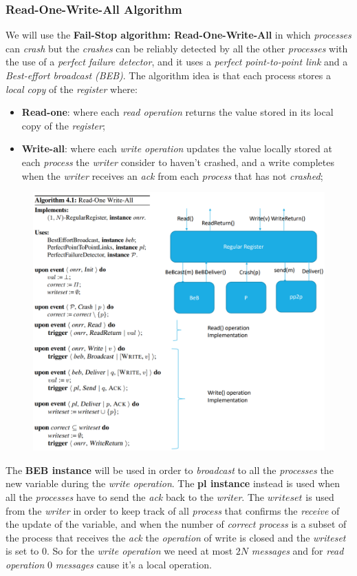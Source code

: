 \documentclass{article}
\begin{document}
\subsubsection{Read-One-Write-All Algorithm}
We will use the \textbf{Fail-Stop algorithm: Read-One-Write-All} in which \emph{processes} can \emph{crash} but the \emph{crashes} can be reliably detected by all the other \emph{processes} with the use of a \emph{perfect failure detector}, and it uses a \emph{perfect point-to-point link} and a \emph{Best-effort broadcast (BEB)}. The algorithm idea is that each process stores a \emph{local copy} of the \emph{register} where:
\begin{itemize}
\item \textbf{Read-one}: where each \emph{read operation} returns the value stored in its local copy of the \emph{register};
\item \textbf{Write-all}: where each \emph{write operation} updates the value locally stored at each \emph{process} the \emph{writer} consider to haven't crashed, and a write completes when the \emph{writer} receives an \emph{ack} from each \emph{process} that has not \emph{crashed};
\end{itemize}
\begin{figure}[H]
  \centering
  \includegraphics[scale=0.9,left]{cattura68.png}
\end{figure}
The \textbf{BEB instance} will be used in order to \emph{broadcast} to all the \emph{processes} the new variable during the \emph{write operation}. The \textbf{pl instance} instead is used when all the \emph{processes} have to send the \emph{ack} back to the \emph{writer}. The $writeset$ is used from the \emph{writer} in order to keep track of all \emph{process} that confirms the \emph{receive} of the update of the variable, and when the number of \emph{correct process} is a subset of the process that receives the \emph{ack} the \emph{operation} of write is closed and the \emph{writeset} is set to $0$. So for the \emph{write operation} we need at most $2N$ \emph{messages} and for \emph{read operation} $0$ \emph{messages} cause it's a local operation.
\clearpage
\end{document}
